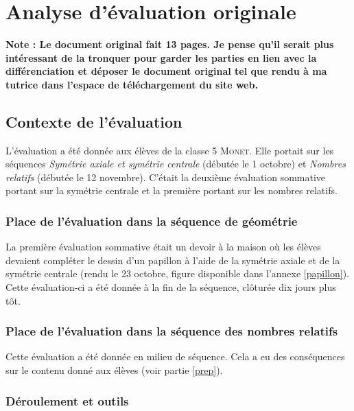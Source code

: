\section{Analyse d'évaluation originale}

\textbf{\color{red}Note : Le document original fait 13 pages. Je pense qu'il serait plus intéressant de la tronquer pour garder les parties en lien avec la différenciation et déposer le document original tel que rendu à ma tutrice dans l'espace de téléchargement du site web.}

\subsection{Contexte de l'évaluation}

L'évaluation a été donnée aux élèves de la classe 5 \textsc{Monet}. Elle portait sur les séquences \textit{Symétrie axiale et symétrie centrale} (débutée le 1 octobre) et \textit{Nombres relatifs} (débutée le 12 novembre). C'était la deuxième évaluation sommative portant sur la symétrie centrale et la première portant sur les nombres relatifs. 

\subsubsection*{Place de l'évaluation dans la séquence de géométrie}
La première évaluation sommative était un devoir à la maison où les élèves devaient compléter le dessin d'un papillon à l'aide de la symétrie axiale et de la symétrie centrale (rendu le 23 octobre, figure disponible dans l'annexe \ref{papillon}). Cette évaluation-ci a été donnée à la fin de la séquence, clôturée dix jours plus tôt.

\subsubsection*{Place de l'évaluation dans la séquence des nombres relatifs}
Cette évaluation a été donnée en milieu de séquence. Cela a eu des conséquences sur le contenu donné aux élèves (voir partie \ref{prep}).

\subsubsection*{Déroulement et outils}\label{cocottes}

